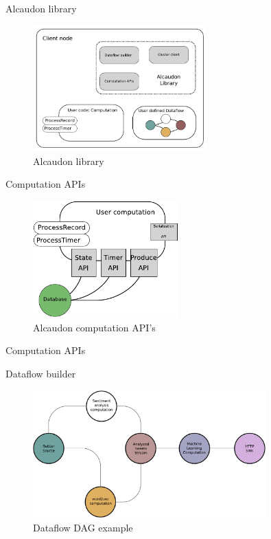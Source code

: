 \documentclass[10pt]{beamer}
\begin{document}
\begin{frame}[fragile]{Alcaudon library}
\begin{figure}[!h]
  \centering
  \includegraphics[width=0.6\textwidth]{../figures/client.pdf}
  \caption{Alcaudon library}
  \label{fig:library}
\end{figure}
\end{frame}


\begin{frame}[fragile]{Computation APIs}
\begin{figure}[!h]
  \centering
  \includegraphics[width=0.5\textwidth]{../figures/libraryApi.pdf}
  \caption{Alcaudon computation API's}
  \label{fig:apis}
\end{figure}
\end{frame}


\begin{frame}[fragile]{Computation APIs}
\computationapi
\end{frame}

\begin{frame}[fragile]{Dataflow builder}
\begin{figure}
  \centering
  \includegraphics[width=0.8\textwidth]{../figures/dataflowbuilder.pdf}
  \caption{Dataflow DAG example}
  \label{fig:dataflowbuilder}
\end{figure}
\end{frame}
\end{document}
